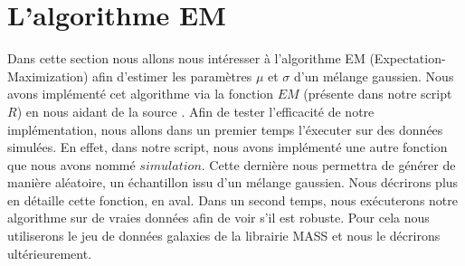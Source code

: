 \documentclass[a4paper,french,10pt]{article}
\begin{document}
\newpage

\section{L'algorithme EM}
Dans cette section nous allons nous intéresser à l'algorithme EM (Expectation-Maximization) afin d'estimer les paramètres $\mu$ et $\sigma$ d'un mélange gaussien. Nous avons implémenté cet algorithme via la fonction $EM$ (présente dans notre script $R$) en nous aidant de la source \cite{EM_algorithm}. Afin de tester l'efficacité de notre implémentation, nous allons dans un premier temps l'éxecuter sur des données simulées. En effet, dans notre script, nous avons implémenté une autre fonction que nous avons nommé $simulation$. Cette dernière nous permettra de générer de manière aléatoire, un échantillon issu d'un mélange gaussien. Nous décrirons plus en détaille cette fonction, en aval. Dans un second temps, nous exécuterons notre algorithme sur de vraies données afin de voir s'il est robuste. Pour cela nous utiliserons le jeu de données galaxies de la librairie MASS et nous le décrirons ultérieurement.
\end{document}
